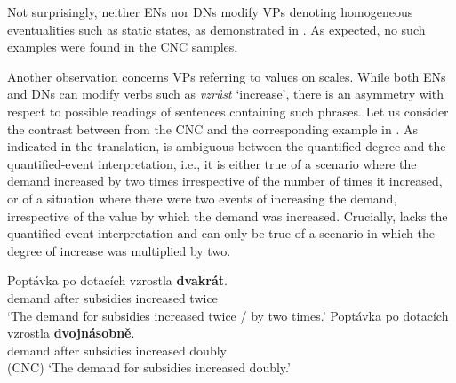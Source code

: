 \documentclass[output=paper,modfonts,hidelinks,newtxmath
\ChapterDOI{10.5281/zenodo.2545513}
]{langscibook}
\begin{document}
\ea {}
\z \z

\noindent Not surprisingly, neither ENs nor DNs modify VPs denoting homogeneous eventualities such as static states, as demonstrated in . As expected, no such examples were found in the CNC samples.

\z

\noindent Another observation concerns VPs referring to values on scales. While both ENs and DNs can modify verbs such as \textit{vzrůst} `increase', there is an asymmetry with respect to possible readings of sentences containing such phrases. Let us consider the contrast between  from the CNC and the corresponding example in . As indicated in the translation,  is ambiguous between the quantified-degree and the quantified-event interpretation, i.e., it is either true of a scenario where the demand increased by two times irrespective of the number of times it increased, or of a situation where there were two events of increasing the demand, irrespective of the value by which the demand was increased. Crucially,  lacks the quantified-event interpretation and can only be true of a scenario in which the degree of increase was multiplied by two.

\ea \ea \gll Poptávka po dotacích vzrostla \textbf{dvakrát}.\label{dvakrat-increase}\\
demand after subsidies increased twice\\
\glt `The demand for subsidies increased twice / by two times.'
\ex \gll Poptávka po dotacích vzrostla \textbf{dvojnásobně}.\label{dvojnasobne-increase}\\
demand after subsidies increased doubly\\\hfill(CNC)
\glt `The demand for subsidies increased doubly.'
\z \z
\end{document}
